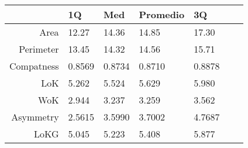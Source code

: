 
\begin{table}[ht]
\centering
\begin{tabular}{|r|l|l|l|l|l|l|}
  \hline
 & 1Q & Med & Promedio & 3Q \\ 
  \hline
     Area & 12.27   &  14.36   & 14.85   & 17.30  \\ 
    Perimeter & 13.45   &  14.32   & 14.56   & 15.71  \\ 
    Compatness & 0.8569   &  0.8734   & 0.8710   & 0.8878 \\ 
       LoK & 5.262   &  5.524   & 5.629   & 5.980 \\ 
       WoK & 2.944   &  3.237   & 3.259   & 3.562 \\ 
    Asymmetry & 2.5615   &  3.5990   & 3.7002   & 4.7687 \\ 
       LoKG & 5.045   &  5.223   & 5.408   & 5.877 \\ 
   \hline
\end{tabular}
\end{table}
